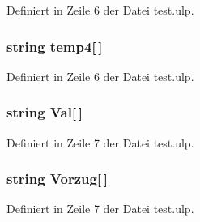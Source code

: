 Definiert in Zeile 6 der Datei test.\+ulp.

\hypertarget{test_8ulp_ad6a0fc9c82629f46ca764b920e57db24}{}
\subsubsection[{temp4}]{\setlength{\rightskip}{0pt plus 5cm}string temp4\mbox{[}$\,$\mbox{]}}\label{test_8ulp_ad6a0fc9c82629f46ca764b920e57db24}


Definiert in Zeile 6 der Datei test.\+ulp.

\hypertarget{test_8ulp_a088204f20433deace071409889b5aba1}{}
\subsubsection[{Val}]{\setlength{\rightskip}{0pt plus 5cm}string Val\mbox{[}$\,$\mbox{]}}\label{test_8ulp_a088204f20433deace071409889b5aba1}


Definiert in Zeile 7 der Datei test.\+ulp.

\hypertarget{test_8ulp_a773ea3bd03d30f9371dda8ee12a97b3a}{}
\subsubsection[{Vorzug}]{\setlength{\rightskip}{0pt plus 5cm}string Vorzug\mbox{[}$\,$\mbox{]}}\label{test_8ulp_a773ea3bd03d30f9371dda8ee12a97b3a}


Definiert in Zeile 7 der Datei test.\+ulp.

